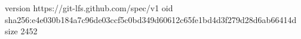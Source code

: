 version https://git-lfs.github.com/spec/v1
oid sha256:e4e030b184a7c96de03ccf5c0bd349d60612c65fe1bd4d3f279d28d6ab66414d
size 2452
